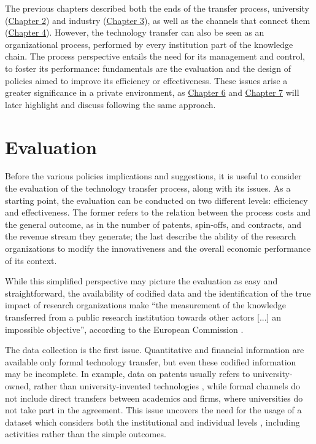 

\label{Chapter5} %

The previous chapters described both the ends of the transfer process, university (\hyperref[Chapter2]{Chapter 2}) and industry (\hyperref[Chapter3]{Chapter 3}), as well as the channels that connect them (\hyperref[Chapter4]{Chapter 4}). However, the technology transfer can also be seen as an organizational process, performed by every institution part of the knowledge chain. The process perspective entails the need for its management and control, to foster its performance: fundamentals are the evaluation and the design of policies aimed to improve its efficiency or effectiveness. These issues arise a greater significance in a private environment, as \hyperref[Chapter6]{Chapter 6} and \hyperref[Chapter7]{Chapter 7} will later highlight and discuss following the same approach.

\section{Evaluation}

Before the various policies implications and suggestions, it is useful to consider the evaluation of the technology transfer process, along with its issues. As a starting point, the evaluation can be conducted on two different levels: efficiency and effectiveness. The former refers to the relation between the process costs and the general outcome, as in the number of patents, spin-offs, and contracts, and the revenue stream they generate; the last describe the ability of the research organizations to modify the innovativeness and the overall economic performance of its context. 

While this simplified perspective may picture the evaluation as easy and straightforward, the availability of codified data and the identification of the true impact of research organizations make \enquote{the measurement of the knowledge transferred from a public research institution towards other actors [...] an impossible objective}, according to the European Commission \citep{Balderi2010}. 

The data collection is the first issue. Quantitative and financial information are available only formal technology transfer, but even these codified information may be incomplete. In example, data on patents usually refers to university-owned, rather than university-invented technologies \citep{Geuna2009}, while formal channels do not include direct transfers between academics and firms, where universities do not take part in the agreement. This issue uncovers the need for the usage of a dataset which considers both the institutional and individual levels \citep{Wong2010}, including activities rather than the simple outcomes. 

